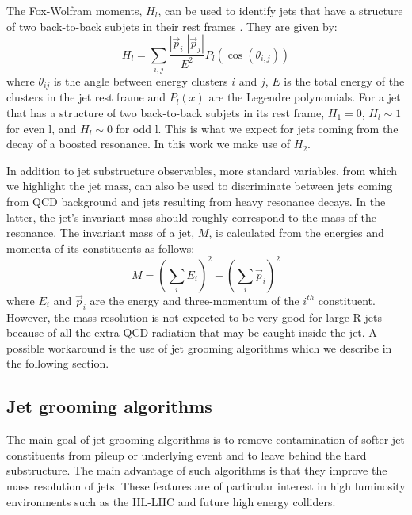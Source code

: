 The Fox-Wolfram moments, $H_l$, can be used to identify jets that have a structure of two back-to-back subjets in their rest frames \cite{FW2}. They are given by:
\begin{equation}
H_l = \sum_{i,j}\frac{|\vec{p}_i||\vec{p}_j|}{E^2}P_l(\cos(\theta_{i,j}))
\end{equation}  
where $\theta_{ij}$ is the angle between energy clusters $i$ and $j$, $E$ is the total energy of the clusters in the jet rest frame and $P_l(x)$ are the Legendre polynomials. For a jet that has a structure of two back-to-back subjets in its rest frame, $H_1 = 0$, $H_l \sim 1$ for even l, and $H_l \sim 0$ for odd l. This is what we expect for jets coming from the decay of a boosted resonance. In this work we make use of $H_2$.

In addition to jet substructure observables, more standard variables, from which we highlight the jet mass, can also be used to discriminate between jets coming from QCD background and jets resulting from heavy resonance decays. In the latter, the jet's invariant mass should roughly correspond to the mass of the resonance. The invariant mass of a jet, $M$, is  calculated from the energies and momenta of its constituents as follows:
\begin{equation}
	M=\left(\sum_{i}E_i\right)^2-\left(\sum_{i}\vec{p}_i\right)^2
\end{equation}
where $E_i$ and $\vec{p}_i$ are the energy and three-momentum of the $i^{th}$ constituent. However, the mass resolution is not expected to be very good for large-R jets because of all the extra QCD radiation that may be caught inside the jet. A possible workaround is the use of jet grooming algorithms which we describe in the following section.

\subsection{Jet grooming algorithms}
\label{section:jet_groom}

The main goal of jet grooming algorithms is to remove contamination of softer jet constituents from pileup or underlying event and to leave behind the hard substructure. The main advantage of such algorithms is that they improve the mass resolution of jets. These features are of particular interest in high luminosity environments such as the HL-LHC and future high energy colliders. 

